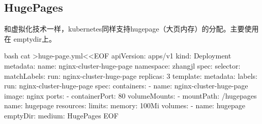 \subsection{HugePages}
和虚拟化技术一样，kubernetes同样支持hugepage（大页内存）的分配。主要使用在
emptydir上。
\begin{code-block}{bash}
cat >huge-page.yml<<EOF
apiVersion: apps/v1
kind: Deployment
metadata:
  name: nginx-cluster-huge-page
  namespace: zhangjl
spec:
  selector:
    matchLabels:
      run: nginx-cluster-huge-page
  replicas: 3
  template:
    metadata:
      labels:
        run: nginx-cluster-huge-page
    spec:
      containers:
        - name: nginx-cluster-huge-page
          image: nginx
          ports:
          - containerPort: 80
          volumeMounts:
            - mountPath: /hugepages
              name: hugepage
          resources:
            limits:
              memory: 100Mi
      volumes:
      - name: hugepage
        emptyDir:
          medium: HugePages
EOF
\end{code-block}